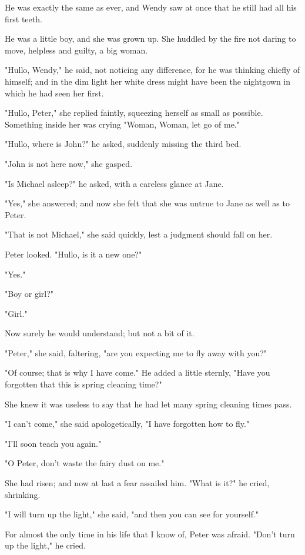 He was exactly the same as ever, and Wendy saw at once that he still had
all his first teeth.


He was a little boy, and she was grown up. She huddled by the fire not
daring to move, helpless and guilty, a big woman.


"Hullo, Wendy," he said, not noticing any difference, for he was thinking
chiefly of himself; and in the dim light her white dress might have been
the nightgown in which he had seen her first.


"Hullo, Peter," she replied faintly, squeezing herself as small as
possible. Something inside her was crying "Woman, Woman, let go of me."


"Hullo, where is John?" he asked, suddenly missing the third bed.


"John is not here now," she gasped.


"Is Michael asleep?" he asked, with a careless glance at Jane.


"Yes," she answered; and now she felt that she was untrue to Jane as well
as to Peter.


"That is not Michael," she said quickly, lest a judgment should fall on
her.


Peter looked. "Hullo, is it a new one?"


"Yes."


"Boy or girl?"


"Girl."


Now surely he would understand; but not a bit of it.


"Peter," she said, faltering, "are you expecting me to fly away with you?"


"Of course; that is why I have come." He added a little sternly, "Have you
forgotten that this is spring cleaning time?"


She knew it was useless to say that he had let many spring cleaning times
pass.


"I can't come," she said apologetically, "I have forgotten how to fly."


"I'll soon teach you again."


"O Peter, don't waste the fairy dust on me."


She had risen; and now at last a fear assailed him. "What is it?" he
cried, shrinking.


"I will turn up the light," she said, "and then you can see for yourself."


For almost the only time in his life that I know of, Peter was afraid.
"Don't turn up the light," he cried.


